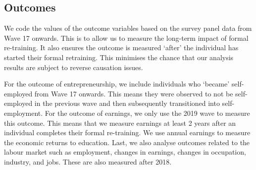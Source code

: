 \documentclass[12pt, a4paper]{article}
\begin{document}
%



\subsection{Outcomes}

We code the values of the outcome variables based on the survey panel data from Wave 17 onwards. This is to allow us to measure the long-term impact of formal re-training. It also ensures the outcome is measured `after' the individual has started their formal retraining. This minimises the chance that our analysis results are subject to reverse causation issues.

For the outcome of entrepreneurship, we include individuals who `became' self-employed from Wave 17 onwards. This means they were observed to not be self-employed in the previous wave and then subsequently transitioned into self-employment. For the outcome of earnings, we only use the 2019 wave to measure this outcome. This means that we measure earnings at least 2 years after an individual completes their formal re-training. We use annual earnings to measure the economic returns to education. Last, we also analyse outcomes related to the labour market such as employment, changes in earnings, changes in occupation, industry, and jobs. These are also measured after 2018. %
\end{document}
